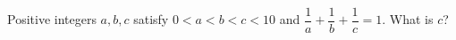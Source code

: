 Positive integers $a,b,c$ satisfy $0<a<b<c<10$ and $\dfrac{1}{a}+\dfrac{1}{b}+\dfrac{1}{c}=1$. What is $c$?
